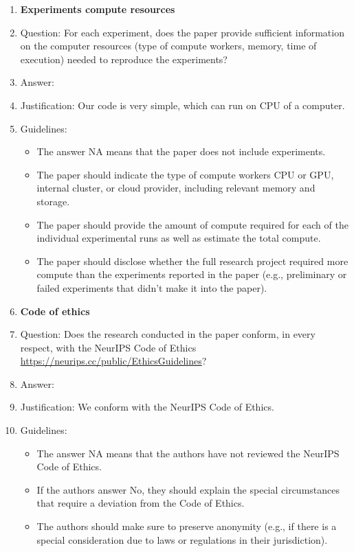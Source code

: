 \documentclass{article}
\theoremstyle{definition}
\begin{document}
\begin{enumerate}
\item {\bf Experiments compute resources}
    \item[] Question: For each experiment, does the paper provide sufficient information on the computer resources (type of compute workers, memory, time of execution) needed to reproduce the experiments?
    \item[] Answer: \answerNo{} %
    \item[] Justification: Our code is very simple, which can run on CPU of a computer.
    \item[] Guidelines:
    \begin{itemize}
        \item The answer NA means that the paper does not include experiments.
        \item The paper should indicate the type of compute workers CPU or GPU, internal cluster, or cloud provider, including relevant memory and storage.
        \item The paper should provide the amount of compute required for each of the individual experimental runs as well as estimate the total compute. 
        \item The paper should disclose whether the full research project required more compute than the experiments reported in the paper (e.g., preliminary or failed experiments that didn't make it into the paper). 
    \end{itemize}
    
\item {\bf Code of ethics}
    \item[] Question: Does the research conducted in the paper conform, in every respect, with the NeurIPS Code of Ethics \url{https://neurips.cc/public/EthicsGuidelines}?
    \item[] Answer: \answerYes{} %
    \item[] Justification: We conform with the NeurIPS Code of Ethics.
    \item[] Guidelines:
    \begin{itemize}
        \item The answer NA means that the authors have not reviewed the NeurIPS Code of Ethics.
        \item If the authors answer No, they should explain the special circumstances that require a deviation from the Code of Ethics.
        \item The authors should make sure to preserve anonymity (e.g., if there is a special consideration due to laws or regulations in their jurisdiction).
    \end{itemize}



\end{enumerate}
\end{document}
